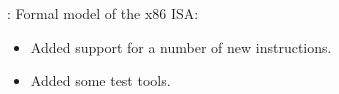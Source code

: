 
\begin{frame}

\implibtitle

:
Formal model of the x86 ISA:
\begin{itemize}
\item Added support for a number of new instructions.
\item Added some test tools.
\end{itemize}

\end{frame}




